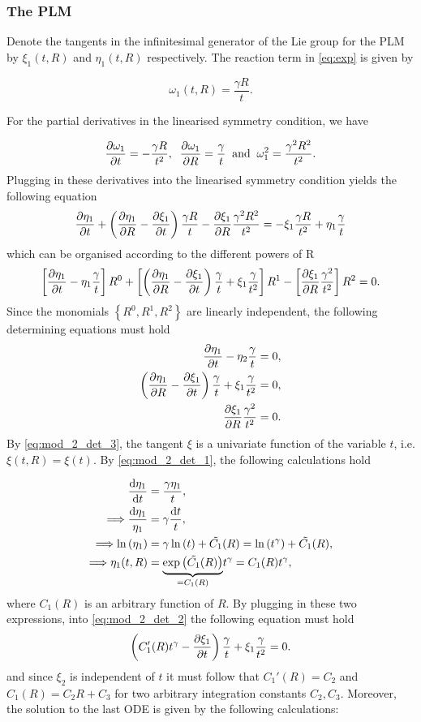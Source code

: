 \subsubsection{The PLM}
Denote the tangents in the infinitesimal generator of the Lie group for the PLM by $\xi_1(t,R)$ and $\eta_1(t,R)$ respectively. The reaction term in \eqref{eq:exp} is given by

$$\omega_1(t,R)=\frac{\gamma R}{t} .$$

For the partial derivatives in the linearised symmetry condition, we have

$$\pdv{\omega_1}{t}=-\frac{\gamma R}{t^2},\;\;\pdv{\omega_1}{R}=\frac{\gamma}{t}\;\;\mathrm{and}\;\;\omega_1^2=\frac{\gamma^2 R^2}{t^2}.$$
Plugging in these derivatives into the linearised symmetry condition yields the following equation
$$\pdv{\eta_1}{t}+\left(\pdv{\eta_1}{R}-\pdv{\xi_1}{t}\right)\frac{\gamma R}{t}-\pdv{\xi_1}{R}\frac{\gamma^2 R^2}{t^2}=-\xi_1\frac{\gamma R}{t^2}+\eta_1\frac{\gamma}{t}$$
which can be organised according to the different powers of R
$$\left[\pdv{\eta_1}{t}-\eta_1\frac{\gamma}{t}\right]R^0+\left[\left(\pdv{\eta_1}{R}-\pdv{\xi_1}{t}\right)\frac{\gamma }{t}+\xi_1\frac{\gamma }{t^2}\right]R^1-\left[\pdv{\xi_1}{R}\frac{\gamma^2}{t^2}\right]R^2=0.$$
Since the monomials $\left\{R^0,R^1,R^2\right\}$ are linearly independent, the following determining equations must hold
\begin{align}
  \pdv{\eta_1}{t}-\eta_2\frac{\gamma}{t}&=0\label{eq:mod_2_det_1},\\
  \left(\pdv{\eta_1}{R}-\pdv{\xi_1}{t}\right)\frac{\gamma }{t}+\xi_1\frac{\gamma }{t^2}&=0\label{eq:mod_2_det_2},\\
\pdv{\xi_1}{R}\frac{\gamma^2}{t^2}&=0.\label{eq:mod_2_det_3}  
\end{align}
By \eqref{eq:mod_2_det_3}, the tangent $\xi$ is a univariate function of the variable $t$, i.e. $\xi(t,R)=\xi(t)$. By \eqref{eq:mod_2_det_1}, the following calculations hold

\begin{align*}
  \dv{\eta_1}{t}&=\dfrac{\gamma\eta_1}{t},\\
  \Longrightarrow \dfrac{\dd\eta_1}{\eta_1}&=\gamma\dfrac{\dd t}{t},\\
  \Longrightarrow \ln\left(\eta_1\right)&=\gamma\ln\left(t\right)+\tilde{C_1}(R)=\ln\left(t^\gamma\right)+\tilde{C_1}(R),\\
  \Longrightarrow \eta_1(t,R)&=\underset{=C_1(R)}{\underbrace{\exp\left(\tilde{C_1}(R)\right)}}t^\gamma=C_1(R)t^\gamma,                                                                         \end{align*}
where $C_1(R)$ is an arbitrary function of $R$. By plugging in these two expressions, into \eqref{eq:mod_2_det_2} the following equation must hold
$$\left(C_1'(R)t^\gamma-\pdv{\xi_1}{t}\right)\frac{\gamma }{t}+\xi_1\frac{\gamma }{t^2}=0.$$
and since $\xi_2$ is independent of $t$ it must follow that $C_1'(R)=C_2$ and $C_1(R)=C_2R+C_3$ for two arbitrary integration constants $C_2,C_3$. Moreover, the solution to the last ODE is given by the following calculations:


